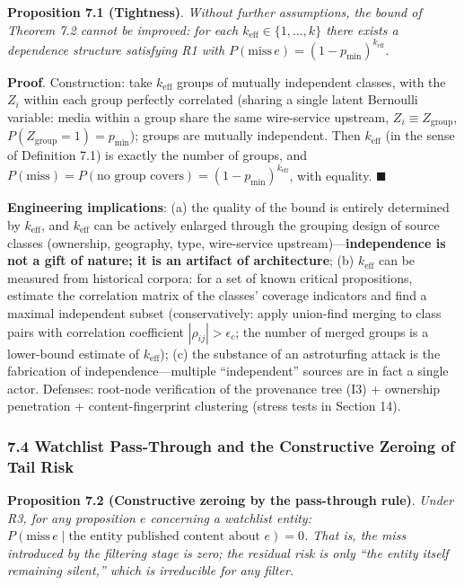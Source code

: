 \documentclass[
  11pt]{article}
\begin{document}
\textbf{Proposition 7.1 (Tightness)}. \emph{Without further assumptions,
the bound of Theorem 7.2 cannot be improved: for each
\(k_{\mathrm{eff}} \in \{1, \dots, k\}\) there exists a dependence
structure satisfying R1 with
\(P(\mathrm{miss}\, e) = (1-p_{\min})^{k_{\mathrm{eff}}}\).}

\textbf{Proof}. Construction: take \(k_{\mathrm{eff}}\) groups of
mutually independent classes, with the \(Z_i\) within each group
perfectly correlated (sharing a single latent Bernoulli variable: media
within a group share the same wire-service upstream,
\(Z_i \equiv Z_{\mathrm{group}}\),
\(P(Z_{\mathrm{group}}=1) = p_{\min}\)); groups are mutually
independent. Then \(k_{\mathrm{eff}}\) (in the sense of Definition 7.1)
is exactly the number of groups, and
\(P(\mathrm{miss}) = P(\text{no group covers}) = (1-p_{\min})^{k_{\mathrm{eff}}}\),
with equality. \(\blacksquare\)

\textbf{Engineering implications}: (a) the quality of the bound is
entirely determined by \(k_{\mathrm{eff}}\), and \(k_{\mathrm{eff}}\)
can be actively enlarged through the grouping design of source classes
(ownership, geography, type, wire-service
upstream)---\textbf{independence is not a gift of nature; it is an
artifact of architecture}; (b) \(k_{\mathrm{eff}}\) can be measured from
historical corpora: for a set of known critical propositions, estimate
the correlation matrix of the classes' coverage indicators and find a
maximal independent subset (conservatively: apply union-find merging to
class pairs with correlation coefficient \(|\rho_{ij}| > \epsilon_c\);
the number of merged groups is a lower-bound estimate of
\(k_{\mathrm{eff}}\)); (c) the substance of an astroturfing attack is
the fabrication of independence---multiple ``independent'' sources are
in fact a single actor. Defenses: root-node verification of the
provenance tree (I3) + ownership penetration + content-fingerprint
clustering (stress tests in Section 14).

\subsubsection{7.4 Watchlist Pass-Through and the Constructive Zeroing
of Tail
Risk}\label{watchlist-pass-through-and-the-constructive-zeroing-of-tail-risk}

\textbf{Proposition 7.2 (Constructive zeroing by the pass-through
rule)}. \emph{Under R3, for any proposition \(e\) concerning a watchlist
entity:
\(P(\mathrm{miss}\, e \mid \text{the entity published content about } e) = 0\).
That is, the miss introduced by the filtering stage is zero; the
residual risk is only ``the entity itself remaining silent,'' which is
irreducible for any filter.}
\end{document}
